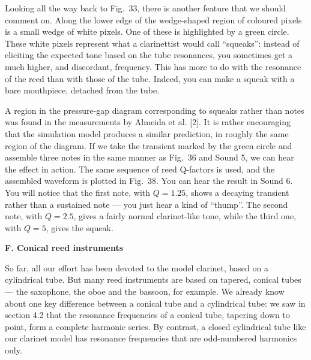 
  Looking all the way back to Fig.\ 33, there is another feature that we should 
  comment on. Along the lower edge of the wedge-shaped region of coloured 
  pixels is a small wedge of white pixels. One of these is highlighted by a 
  green circle. These white pixels represent what a clarinettist would call 
  “squeaks”: instead of eliciting the expected tone based on the tube 
  resonances, you sometimes get a much higher, and discordant, frequency. This 
  has more to do with the resonance of the reed than with those of the tube. 
  Indeed, you can make a squeak with a bare mouthpiece, detached from the tube. 

  A region in the pressure-gap diagram corresponding to squeaks rather than 
  notes was found in the measurements by Almeida et al. [2]. It is rather 
  encouraging that the simulation model produces a similar prediction, in 
  roughly the same region of the diagram. If we take the transient marked by 
  the green circle and assemble three notes in the same manner as Fig.\ 36 and 
  Sound 5, we can hear the effect in action. The same sequence of reed 
  Q-factors is used, and the assembled waveform is plotted in Fig.\ 38. You can 
  hear the result in Sound 6. You will notice that the first note, with 
  $Q=1.25$, shows a decaying transient rather than a sustained note --- you 
  just hear a kind of ``thump''. The second note, with $Q=2.5$, gives a fairly 
  normal clarinet-like tone, while the third one, with $Q=5$, gives the squeak. 


\audio{}

  \textbf{F. Conical reed instruments} 

  So far, all our effort has been devoted to the model clarinet, based on a 
  cylindrical tube. But many reed instruments are based on tapered, conical 
  tubes — the saxophone, the oboe and the bassoon, for example. We already know 
  about one key difference between a conical tube and a cylindrical tube: we 
  saw in section 4.2 that the resonance frequencies of a conical tube, tapering 
  down to point, form a complete harmonic series. By contrast, a closed 
  cylindrical tube like our clarinet model has resonance frequencies that are 
  odd-numbered harmonics only. 

